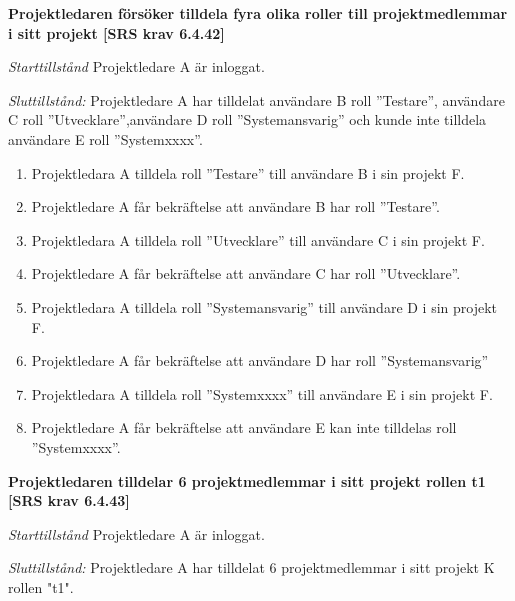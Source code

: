 \documentclass[a4paper]{article}
\begin{document}
\begin{FT}
\item %
\textbf{Projektledaren försöker tilldela fyra olika roller till projektmedlemmar i sitt projekt [SRS krav 6.4.42]}

\emph{Starttillstånd} Projektledare A är inloggat.

\emph{Sluttillstånd:} Projektledare A  har tilldelat användare B roll ”Testare”, användare C roll ”Utvecklare”,användare D roll ”Systemansvarig” och kunde inte tilldela användare E roll ”Systemxxxx”.

\begin{enumerate}
\item Projektledara A tilldela roll ”Testare” till användare B i sin projekt F.
\item Projektledare A får bekräftelse att användare B har roll ”Testare”.
\item Projektledara A tilldela roll ”Utvecklare” till användare C i sin projekt F.
\item Projektledare A får bekräftelse att användare C har roll ”Utvecklare”.
\item Projektledara A tilldela roll ”Systemansvarig” till användare D i sin projekt F.
\item Projektledare A får bekräftelse att användare D har roll ”Systemansvarig”
\item Projektledara A tilldela roll ”Systemxxxx” till användare E i sin projekt F.
\item Projektledare A får bekräftelse att användare E kan inte tilldelas roll ”Systemxxxx”.
\end{enumerate}

\item %
\textbf{Projektledaren tilldelar 6 projektmedlemmar i sitt projekt rollen t1 [SRS krav 6.4.43]}

\emph{Starttillstånd} Projektledare A är inloggat.

\emph{Sluttillstånd:} Projektledare A  har tilldelat 6 projektmedlemmar i sitt projekt K  rollen "t1".


\end{FT}
\end{document}
